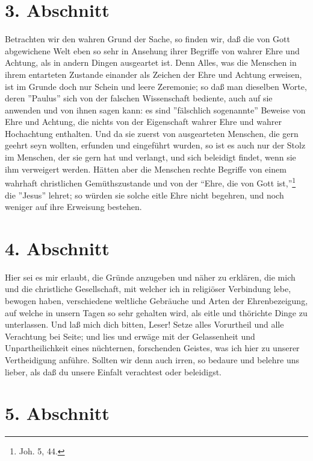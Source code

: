 \section{3. Abschnitt}

Betrachten wir den wahren Grund der Sache, so finden wir, daß die von Gott abgewichene Welt eben so sehr in Ansehung ihrer Begriffe von wahrer Ehre und Achtung, als in andern Dingen ausgeartet ist. Denn Alles, was die Menschen in ihrem entarteten Zustande einander als Zeichen der Ehre und Achtung erweisen, ist im Grunde doch nur Schein und leere Zeremonie; so daß man dieselben Worte, deren ''Paulus'' sich von der falschen Wissenschaft bediente, auch auf sie anwenden und von ihnen sagen kann: es sind ''fälschlich sogenannte'' Beweise von Ehre und Achtung, die nichts von der Eigenschaft wahrer Ehre und wahrer Hochachtung enthalten. Und da sie zuerst von ausgearteten Menschen, die gern geehrt seyn wollten, erfunden und eingeführt wurden, so ist es auch nur der Stolz im Menschen, der sie gern hat und verlangt, und sich beleidigt findet, wenn sie ihm verweigert werden. Hätten aber die Menschen rechte Begriffe von einem wahrhaft christlichen Gemüthszustande und von der "`Ehre, die von Gott ist,"'\footnote{Joh. 5, 44.} die ''Jesus'' lehret; so würden sie solche eitle Ehre nicht begehren, und noch weniger auf ihre Erweisung bestehen.

\section{4. Abschnitt}

Hier sei es mir erlaubt, die Gründe anzugeben und näher zu erklären, die mich und die christliche Gesellschaft, mit welcher ich in religiöser Verbindung lebe, bewogen haben, verschiedene weltliche Gebräuche und Arten der Ehrenbezeigung, auf welche in unsern Tagen so sehr gehalten wird, als eitle und thörichte Dinge zu unterlassen. Und laß mich dich bitten, Leser! Setze alles Vorurtheil und alle Verachtung bei Seite; und lies und erwäge mit der Gelassenheit und Unpartheilichkeit eines nüchternen, forschenden Geistes, was ich hier zu unserer Vertheidigung anführe. Sollten wir denn auch irren, so bedaure und belehre uns lieber, als daß du unsere Einfalt verachtest oder beleidigst.

\section{5. Abschnitt}


